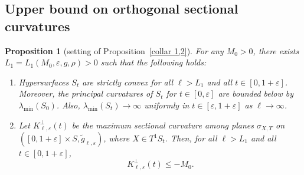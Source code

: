 \documentclass[10pt]{amsart}
\newtheorem{proposition}[theorem]{Proposition}
\theoremstyle{definition}
\let\eps\varepsilon
\renewcommand{\>}{{\rangle}}
\newcommand{\<}{{\langle}}
\let\Subsection\subsection\let\Subsubsection\subsubsection
\begin{document}
\Subsection{Upper bound on orthogonal sectional curvatures}\label{sec: normcurvC1C2}

\begin{proposition}[setting of Proposition~\ref{collar 1,2}]\label{prop: collar 1,2}
For any $M_0>0$, there exists $L_1=L_1(M_0, \eps, g, \rho)>0$ such that the following holds:
\begin{enumerate}
\item\label{convexity} Hypersurfaces $S_t$ are strictly convex for all $\ell>L_1$ and all $t\in[0,1+\eps]$. Moreover, the principal curvatures of $S_t$ for $t\in[0,\eps]$ are bounded below by $\lambda_{\min}(S_0)$. Also, $\lambda_{\min}(S_t)\to\infty$ uniformly in $t\in[\eps,1+\eps]$ as $\ell\to\infty$.
\item\label{normal} Let $K^\perp_{\ell,\eps}(t)$ be the maximum sectional curvature among planes $\sigma_{X,T}$ on \hbox{$([0,1+\eps]\times S, \tilde g_{\ell,\eps})$}, where $X\in T^1S_t$. Then, for all $\ell>L_1$ and all $t\in[0,1+\eps]$,
\begin{equation*}
K^\perp_{\ell,\eps}(t)\leq -M_0.
\end{equation*}
\end{enumerate}
\end{proposition}
\end{document}
